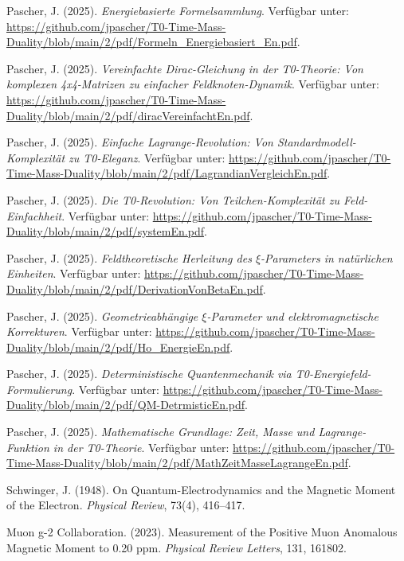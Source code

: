 \documentclass[12pt,a4paper]{article}
\numberwithin{equation}{section}
\begin{document}
\begin{thebibliography}{99}
		Pascher, J. (2025). \emph{Energiebasierte Formelsammlung}. Verfügbar unter: \url{https://github.com/jpascher/T0-Time-Mass-Duality/blob/main/2/pdf/Formeln_Energiebasiert_En.pdf}.
		
		Pascher, J. (2025). \emph{Vereinfachte Dirac-Gleichung in der T0-Theorie: Von komplexen 4x4-Matrizen zu einfacher Feldknoten-Dynamik}. Verfügbar unter: \url{https://github.com/jpascher/T0-Time-Mass-Duality/blob/main/2/pdf/diracVereinfachtEn.pdf}.
		
		Pascher, J. (2025). \emph{Einfache Lagrange-Revolution: Von Standardmodell-Komplexität zu T0-Eleganz}. Verfügbar unter: \url{https://github.com/jpascher/T0-Time-Mass-Duality/blob/main/2/pdf/LagrandianVergleichEn.pdf}.
		
		Pascher, J. (2025). \emph{Die T0-Revolution: Von Teilchen-Komplexität zu Feld-Einfachheit}. Verfügbar unter: \url{https://github.com/jpascher/T0-Time-Mass-Duality/blob/main/2/pdf/systemEn.pdf}.
		
		Pascher, J. (2025). \emph{Feldtheoretische Herleitung des $\xi$-Parameters in natürlichen Einheiten}. Verfügbar unter: \url{https://github.com/jpascher/T0-Time-Mass-Duality/blob/main/2/pdf/DerivationVonBetaEn.pdf}.
		
		Pascher, J. (2025). \emph{Geometrieabhängige $\xi$-Parameter und elektromagnetische Korrekturen}. Verfügbar unter: \url{https://github.com/jpascher/T0-Time-Mass-Duality/blob/main/2/pdf/Ho_EnergieEn.pdf}.
		
		Pascher, J. (2025). \emph{Deterministische Quantenmechanik via T0-Energiefeld-Formulierung}. Verfügbar unter: \url{https://github.com/jpascher/T0-Time-Mass-Duality/blob/main/2/pdf/QM-DetrmisticEn.pdf}.
		
		Pascher, J. (2025). \emph{Mathematische Grundlage: Zeit, Masse und Lagrange-Funktion in der T0-Theorie}. Verfügbar unter: \url{https://github.com/jpascher/T0-Time-Mass-Duality/blob/main/2/pdf/MathZeitMasseLagrangeEn.pdf}.
		
		Schwinger, J. (1948). On Quantum-Electrodynamics and the Magnetic Moment of the Electron. \emph{Physical Review}, 73(4), 416–417.
		
		Muon g-2 Collaboration. (2023). Measurement of the Positive Muon Anomalous Magnetic Moment to 0.20 ppm. \emph{Physical Review Letters}, 131, 161802.
		

\end{thebibliography}
\end{document}
